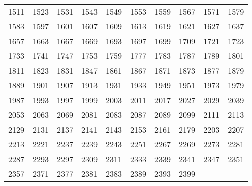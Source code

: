 \begin{longtable}{*{10}{l}}
1511&1523&1531&1543&1549&1553&1559&1567&1571&1579\\
1583&1597&1601&1607&1609&1613&1619&1621&1627&1637\\
1657&1663&1667&1669&1693&1697&1699&1709&1721&1723\\
1733&1741&1747&1753&1759&1777&1783&1787&1789&1801\\
1811&1823&1831&1847&1861&1867&1871&1873&1877&1879\\
1889&1901&1907&1913&1931&1933&1949&1951&1973&1979\\
1987&1993&1997&1999&2003&2011&2017&2027&2029&2039\\
2053&2063&2069&2081&2083&2087&2089&2099&2111&2113\\
2129&2131&2137&2141&2143&2153&2161&2179&2203&2207\\
2213&2221&2237&2239&2243&2251&2267&2269&2273&2281\\
2287&2293&2297&2309&2311&2333&2339&2341&2347&2351\\
2357&2371&2377&2381&2383&2389&2393&2399&\\
\bottomrule\end{longtable}
